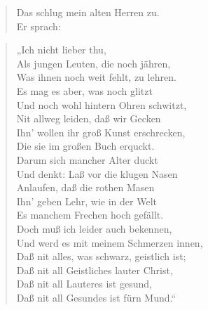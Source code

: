 \begin{verse}
Das schlug mein alten Herren zu.\\
Er sprach:
\end{verse}

\begin{quote}
„Ich nicht lieber thu,\\
Als jungen Leuten, die noch jähren,\\
Was ihnen noch weit fehlt, zu lehren.\\
Es mag es aber, was noch glitzt\\
Und noch wohl hintern Ohren schwitzt,\\
Nit allweg leiden, daß wir Gecken\\
Ihn’ wollen ihr groß Kunst erschrecken,\\
Die sie im großen Buch erquckt.\\
Darum sich mancher Alter duckt\\
Und denkt: Laß vor die klugen Nasen\\
Anlaufen, daß die rothen Masen\\
Ihn’ geben Lehr, wie in der Welt\\
Es manchem Frechen hoch gefällt.\\
Doch muß ich leider auch bekennen,\\
Und werd es mit meinem Schmerzen innen,\\
Daß nit alles, was schwarz, geistlich ist;\\
Daß nit all Geistliches lauter Christ,\\
Daß nit all Lauteres ist gesund,\\
Daß nit all Gesundes ist fürn Mund.“
\end{quote}

